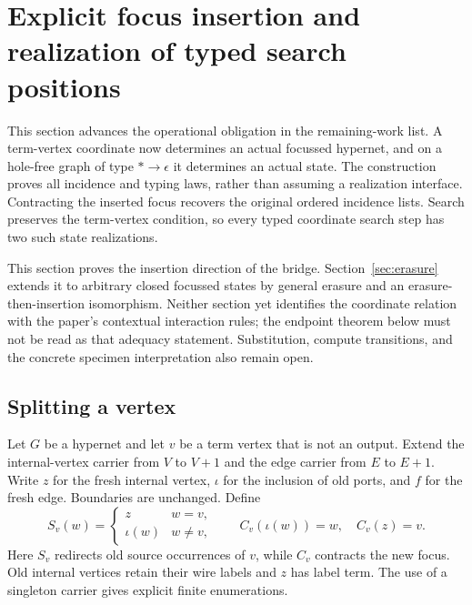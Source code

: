 \section{Explicit focus insertion and realization of typed search positions}
\label{sec:realization}

This section advances the operational obligation in the remaining-work list.
A term-vertex coordinate now determines an actual focussed hypernet, and on a
hole-free graph of type $*\to\epsilon$ it determines an actual state. The
construction proves all incidence and typing laws, rather than assuming a
realization interface. Contracting the inserted focus recovers the original
ordered incidence lists. Search preserves the term-vertex condition, so every
typed coordinate search step has two such state realizations.

This section proves the insertion direction of the bridge.
Section~\ref{sec:erasure} extends it to arbitrary closed focussed states by
general erasure and an erasure-then-insertion isomorphism. Neither section yet
identifies the coordinate relation with the paper's contextual interaction
rules; the endpoint theorem below must not be read as that adequacy statement. Substitution, compute transitions, and
the concrete specimen interpretation also remain open.

\subsection{Splitting a vertex}
\begin{definition}\label{term:focus-insertion}
Let $G$ be a hypernet and let $v$ be a term vertex that is not an output. Extend
the internal-vertex carrier from $V$ to $V+1$ and the edge carrier from $E$ to
$E+1$. Write $z$ for the fresh internal vertex, $\iota$ for the inclusion of old
ports, and $f$ for the fresh edge. Boundaries are unchanged. Define
\[
 S_v(w)=\begin{cases}z&w=v,\\\iota(w)&w\ne v,\end{cases}
 \qquad
 C_v(\iota(w))=w,\quad C_v(z)=v.
\]
Here $S_v$ redirects old source occurrences of $v$, while $C_v$ contracts the
new focus. Old internal vertices retain their wire labels and $z$ has label
term. The use of a singleton carrier gives explicit finite enumerations.
\end{definition}

